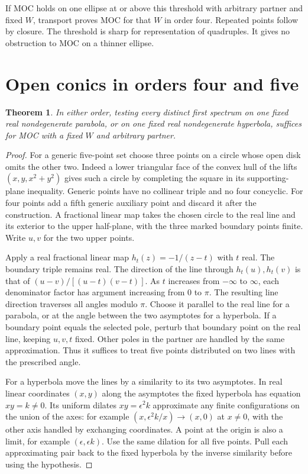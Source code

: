 \documentclass[11pt]{article}
\newtheorem{theorem}{Theorem}
\begin{document}
If MOC holds on one ellipse at or above this threshold with arbitrary
partner and fixed $W$, transport proves MOC for that $W$ in order four.
Repeated points follow by closure. The threshold is sharp for
representation of quadruples. It gives no obstruction to MOC on a
thinner ellipse.

\section*{Open conics in orders four and five}
\begin{theorem}
In either order, testing every distinct first spectrum on one fixed
real nondegenerate parabola, or on one fixed real nondegenerate
hyperbola, suffices for MOC with a fixed $W$ and arbitrary partner.
\end{theorem}
\begin{proof}
For a generic five-point set choose three points on a circle whose
open disk omits the other two. Indeed a lower triangular face of the
convex hull of the lifts $(x,y,x^2+y^2)$ gives such a circle by
completing the square in its supporting-plane inequality. Generic
points have no collinear triple and no four concyclic. For four
points add a fifth generic auxiliary point and discard it after the
construction. A fractional linear map takes the chosen circle to the
real line and its exterior to the upper half-plane, with the three
marked boundary points finite. Write $u,v$ for the two upper points.

Apply a real fractional linear map $h_t(z)=-1/(z-t)$ with $t$ real.
The boundary triple remains real. The direction of the line through
$h_t(u),h_t(v)$ is that of $(u-v)/[(u-t)(v-t)]$. As $t$ increases
from $-\infty$ to $\infty$, each denominator factor has argument
increasing from $0$ to $\pi$. The resulting line direction traverses
all angles modulo $\pi$. Choose it parallel to the real line for a
parabola, or at the angle between the two asymptotes for a hyperbola.
If a boundary point equals the selected pole, perturb that boundary
point on the real line, keeping $u,v,t$ fixed. Other poles in the
partner are handled by the same approximation. Thus it suffices to
treat five points distributed on two lines with the prescribed angle.

For a hyperbola move the lines by a similarity to its two asymptotes.
In real linear coordinates $(x,y)$ along the asymptotes the fixed
hyperbola has equation $xy=k\ne0$. Its uniform dilates $xy=\epsilon^2k$
approximate any finite configurations on the union of the axes:
for example $(x,\epsilon^2 k/x)\to(x,0)$ at $x\ne0$, with the
other axis handled by exchanging coordinates. A point at the origin
is also a limit, for example $(\epsilon,\epsilon k)$. Use the same
dilation for all five points. Pull each approximating pair back to the
fixed hyperbola by the inverse similarity before using the hypothesis.


\end{proof}
\end{document}
